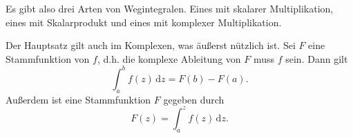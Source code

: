 \documentclass[a4paper,10pt,fleqn,twocolumn,twoside]{article}
\begin{document}
Es gibt also drei Arten von Wegintegralen. Eines mit skalarer
Multiplikation, eines mit Skalarprodukt und eines mit komplexer
Multiplikation.

Der Hauptsatz gilt auch im Komplexen, was äußerst
nützlich ist. Sei \(F\) eine Stammfunktion von \(f\), d.h. die
komplexe Ableitung von \(F\) muss \(f\) sein. Dann gilt
\[\int_a^b f(z)\,\mathrm dz = F(b)-F(a).\]
Außerdem ist eine Stammfunktion \(F\) gegeben durch
\[F(z) = \int_a^z f(z)\,\mathrm dz.\]
\end{document}
